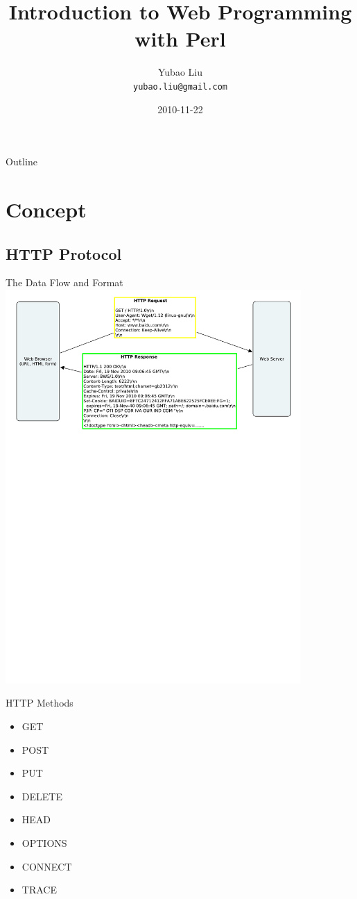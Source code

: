 \documentclass{beamer}
\title{Introduction to Web Programming with Perl}
\author{Yubao Liu \\ \texttt{yubao.liu@gmail.com}}
\date{2010-11-22}
\begin{document}
\begin{frame}
  \titlepage
\end{frame}

\begin{frame}{Outline}
  \tableofcontents
\end{frame}


\section{Concept}

\subsection{HTTP Protocol}

\begin{frame}{The Data Flow and Format}
  \includegraphics[height=15cm]{data-flow-format}
\end{frame}

\begin{frame}{HTTP Methods}
  \begin{itemize}
    \item GET
    \item POST
    \item PUT
    \item DELETE
    \item HEAD
    \item OPTIONS
    \item CONNECT
    \item TRACE
  \end{itemize}
\end{frame}
\end{document}
